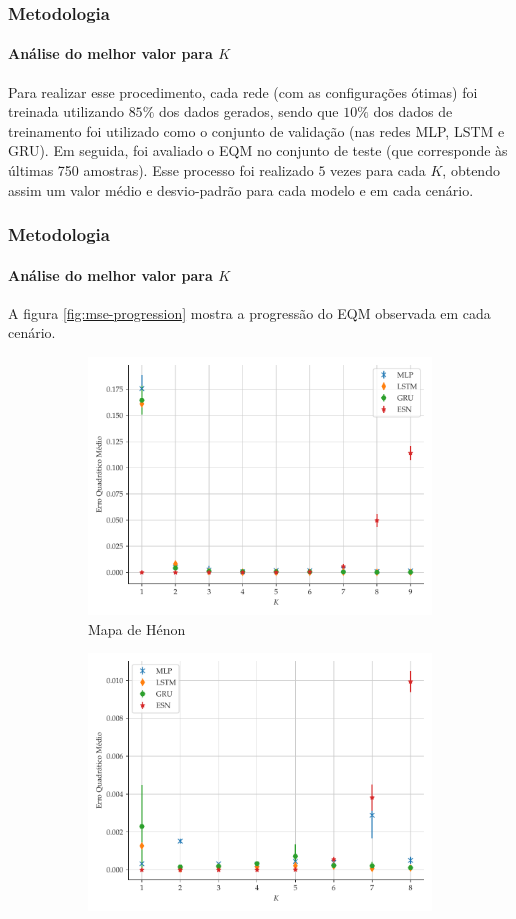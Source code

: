 \documentclass[aspectratio=169]{beamer}
\begin{document}
\begin{frame}
\frametitle{Metodologia}
\framesubtitle{Análise do melhor valor para $K$}
\justifying 
Para realizar esse procedimento, cada rede (com as configurações ótimas) foi treinada utilizando $85\%$ dos dados gerados, sendo que $10\%$ dos dados de treinamento foi utilizado como o conjunto de validação (nas redes MLP, LSTM e GRU). Em seguida, foi avaliado o EQM no conjunto de teste (que corresponde às últimas 750 amostras). Esse processo foi realizado $5$ vezes para cada $K$, obtendo assim um valor médio e desvio-padrão para cada modelo e em cada cenário. 
\end{frame}

\begin{frame}
\frametitle{Metodologia}
\framesubtitle{Análise do melhor valor para $K$}
\justifying 
A figura \ref{fig:mse-progression} mostra a progressão do EQM observada em cada cenário. 
\begin{figure}[H]
     \begin{subfigure}[t]{0.4\textwidth} 
     \centering
         \includegraphics[scale=0.17]{progressao-k-henon.pdf}
         \caption{Mapa de Hénon}
     \end{subfigure}
     \centering
     \begin{subfigure}[t]{0.4\textwidth} 
     \centering
         \includegraphics[scale=0.17]{progressao-k-logistic.pdf}

\end{subfigure}
\end{figure}
\end{frame}
\end{document}
